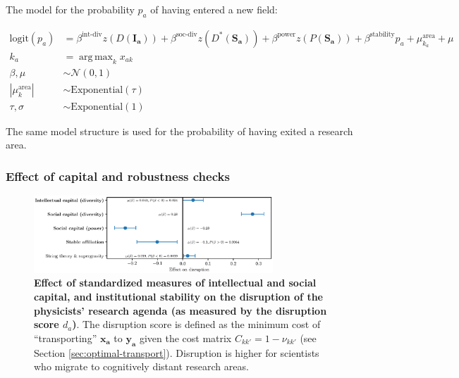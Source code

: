 \documentclass{article}
\DeclareMathOperator*{\argmax}{arg\,max}
\begin{document}
The model for the probability $p_a$ of having entered a new field:

\begin{align*}
    \mathrm{logit}(p_a) &= \beta^{\text{int-div}} z(D(\bm{I_a}))+\beta^{\text{soc-div}}z(D^{\ast}(\bm{S_a})) + \beta^{\text{power}} z(P(\bm{S_a})) + \beta^{\text{stability}} p_a   + \mu^{\text{area}}_{k_a} + \mu\\
    k_a &= \argmax_k x_{ak}\\
    \beta,\mu &\sim \mathcal{N}(0, 1)\\
    |\mu^{\text{area}}_k| &\sim \mathrm{Exponential}(\tau)\\
    \tau,\sigma &\sim \mathrm{Exponential}(1)
\end{align*}

The same model structure is used for the probability of having exited a research area.

\subsubsection{\label{appendix:robustness}Effect of capital and robustness checks}


\begin{figure}[H]
    \centering
    \includegraphics[width=0.8\textwidth]{plots/Fig16.eps}
    \caption{\textbf{Effect of standardized measures of intellectual and social capital, and institutional stability on the disruption of the physicists' research agenda (as measured by the disruption score $d_a$)}. The disruption score is defined as the minimum cost of ``transporting'' $\bm{x_a}$ to $\bm{y_a}$ given the cost matrix $C_{kk'}=1-\nu_{kk'}$ (see Section \ref{sec:optimal-transport}). Disruption is higher for scientists who migrate to cognitively distant research areas.}
    \label{fig:disruption_score_effect}
\end{figure}





\end{document}
